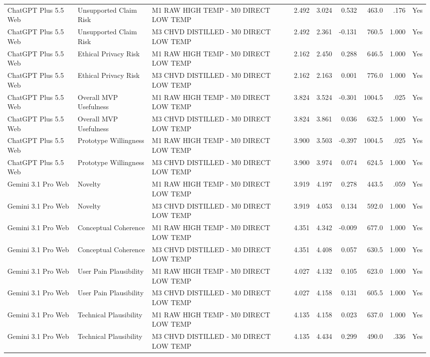 \documentclass[10pt]{article}
\begin{document}
\begin{landscape}
\begin{longtable}{lllrrrrrr}
ChatGPT Plus 5.5 Web & Unsupported Claim Risk & M1 RAW HIGH TEMP - M0 DIRECT LOW TEMP & 2.492 & 3.024 & 0.532 & 463.0 & .176 & Yes \\
ChatGPT Plus 5.5 Web & Unsupported Claim Risk & M3 CHVD DISTILLED - M0 DIRECT LOW TEMP & 2.492 & 2.361 & -0.131 & 760.5 & 1.000 & Yes \\
ChatGPT Plus 5.5 Web & Ethical Privacy Risk & M1 RAW HIGH TEMP - M0 DIRECT LOW TEMP & 2.162 & 2.450 & 0.288 & 646.5 & 1.000 & Yes \\
ChatGPT Plus 5.5 Web & Ethical Privacy Risk & M3 CHVD DISTILLED - M0 DIRECT LOW TEMP & 2.162 & 2.163 & 0.001 & 776.0 & 1.000 & Yes \\
ChatGPT Plus 5.5 Web & Overall MVP Usefulness & M1 RAW HIGH TEMP - M0 DIRECT LOW TEMP & 3.824 & 3.524 & -0.301 & 1004.5 & .025 & Yes \\
ChatGPT Plus 5.5 Web & Overall MVP Usefulness & M3 CHVD DISTILLED - M0 DIRECT LOW TEMP & 3.824 & 3.861 & 0.036 & 632.5 & 1.000 & Yes \\
ChatGPT Plus 5.5 Web & Prototype Willingness & M1 RAW HIGH TEMP - M0 DIRECT LOW TEMP & 3.900 & 3.503 & -0.397 & 1004.5 & .025 & Yes \\
ChatGPT Plus 5.5 Web & Prototype Willingness & M3 CHVD DISTILLED - M0 DIRECT LOW TEMP & 3.900 & 3.974 & 0.074 & 624.5 & 1.000 & Yes \\
Gemini 3.1 Pro Web & Novelty & M1 RAW HIGH TEMP - M0 DIRECT LOW TEMP & 3.919 & 4.197 & 0.278 & 443.5 & .059 & Yes \\
Gemini 3.1 Pro Web & Novelty & M3 CHVD DISTILLED - M0 DIRECT LOW TEMP & 3.919 & 4.053 & 0.134 & 592.0 & 1.000 & Yes \\
Gemini 3.1 Pro Web & Conceptual Coherence & M1 RAW HIGH TEMP - M0 DIRECT LOW TEMP & 4.351 & 4.342 & -0.009 & 677.0 & 1.000 & Yes \\
Gemini 3.1 Pro Web & Conceptual Coherence & M3 CHVD DISTILLED - M0 DIRECT LOW TEMP & 4.351 & 4.408 & 0.057 & 630.5 & 1.000 & Yes \\
Gemini 3.1 Pro Web & User Pain Plausibility & M1 RAW HIGH TEMP - M0 DIRECT LOW TEMP & 4.027 & 4.132 & 0.105 & 623.0 & 1.000 & Yes \\
Gemini 3.1 Pro Web & User Pain Plausibility & M3 CHVD DISTILLED - M0 DIRECT LOW TEMP & 4.027 & 4.158 & 0.131 & 605.5 & 1.000 & Yes \\
Gemini 3.1 Pro Web & Technical Plausibility & M1 RAW HIGH TEMP - M0 DIRECT LOW TEMP & 4.135 & 4.158 & 0.023 & 637.0 & 1.000 & Yes \\
Gemini 3.1 Pro Web & Technical Plausibility & M3 CHVD DISTILLED - M0 DIRECT LOW TEMP & 4.135 & 4.434 & 0.299 & 490.0 & .336 & Yes \\

\end{longtable}
\end{landscape}
\end{document}
